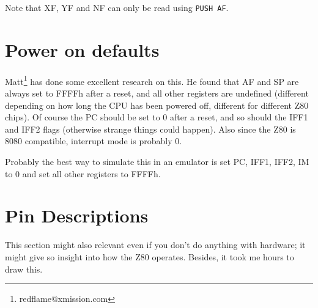 \documentclass[oneside,a4paper]{book}
\begin{document}
Note that XF, YF and NF can only be read using
{\tt PUSH AF}.

\section{Power on defaults}
\label{pon}

Matt\footnote{redflame@xmission.com} has done some excellent research on 
this. He found that AF and SP are always set to FFFFh after a reset, and 
all other registers are undefined (different depending on how long the CPU 
has been powered off, different for different Z80 chips). Of course the PC 
should be set to 0 after a reset, and so should the IFF1 and IFF2 flags 
(otherwise strange things could happen). Also since the Z80 is 8080 
compatible, interrupt mode is probably 0.

Probably the best way to simulate this in an emulator is set PC, IFF1,
IFF2, IM to 0 and set all other registers to FFFFh.

\section{Pin Descriptions \cite{datasheet}}

This section might also relevant even if you don't do anything with 
hardware; it might give so insight into how the Z80 operates. Besides, 
it took me hours to draw this.\\[1ex]
\end{document}
